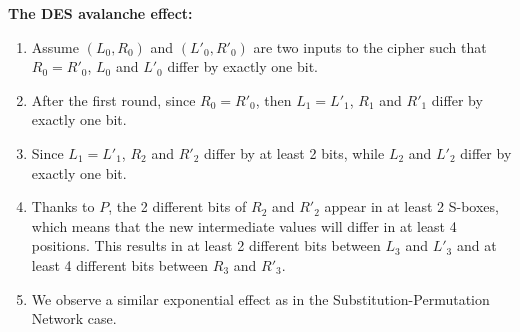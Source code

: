 		\textbf{The DES avalanche effect:}
		\begin{enumerate}
			\item Assume $(L_0,R_0)$ and $(L'_0,R'_0)$ are two inputs to the cipher such that $R_0 = R'_0$, $L_0$ and $L'_0$ differ by exactly one bit.
			\item After the first round, since $R_0 = R'_0$, then $L_1 = L'_1$, $R_1$ and $R'_1$ differ by exactly one bit.
			\item Since $L_1 = L'_1$, $R_2$ and $R'_2$ differ by at least 2 bits, while $L_2$ and $L'_2$ differ by exactly one bit.
			\item Thanks to $P$, the 2 different bits of $R_2$ and $R'_2$ appear in at least 2 S-boxes, which means that the new intermediate values will differ in at least 4 positions.
			This results in at least 2 different bits between $L_3$ and $L'_3$ and at least 4 different bits between $R_3$ and $R'_3$.
			\item We observe a similar exponential effect as in the Substitution-Permutation Network case.
		\end{enumerate}

\newpage
